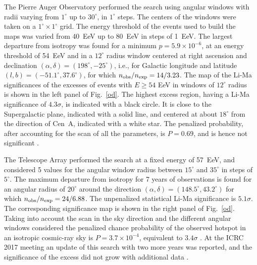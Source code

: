 \documentclass[twoside,12pt]{article}
\begin{document}
 The Pierre Auger Observatory performed the search using angular windows with radii varying from $1^\circ$ up to $30^\circ$, in $1^\circ$ steps. The centers of the windows were taken on a $1^\circ \times 1^\circ$ grid. The energy threshold of the events used to build the maps was varied from 40~EeV up to 80~EeV in steps of 1~EeV. The largest departure from isotropy was found for a minimum  $p = 5.9 \times 10^{-6}$, at an energy threshold of 54~EeV and in a $12^\circ$ radius window centered at right ascension and declination  $(\alpha,\delta)=(198^\circ ,-25^\circ  )$, i.e., for Galactic longitude and latitude $( l , b ) = ( - 51.1^\circ, 37.6^\circ)$, for which $n_{\rm obs}/n_{\rm exp} = 14/3.23$. The map of the Li-Ma \cite{lima83} significances of the excesses of events with $E \geq 54$ EeV in windows of $12^\circ$ radius is shown in the left panel of Fig.~\ref{od}. The highest excess region, having a Li-Ma significance of $4.3\sigma$, is indicated with a black circle. It is close to the Supergalactic plane, indicated with a solid line, and centered at about $18^\circ$ from the direction of Cen~A, indicated with a white star. The penalized probability, after accounting for the scan of all the parameters, is $P=0.69$, and is hence not significant \cite{SS15}.
 
 The Telescope Array performed the search at a fixed energy of 57~EeV, and considered 5 values for the angular window radius between $15^\circ$ and $35^\circ$ in steps of $5^\circ$. The maximum departure from isotropy for 7 years of observations is found for an angular radius of $20^\circ$ around the direction $(\alpha,\delta)= (148.5^\circ, 43.2^\circ)$ for which $n_{\rm obs}/n_{\rm exp} = 24/6.88$. The unpenalized statistical Li-Ma significance is $5.1\sigma$. The corresponding significance map is shown in the right panel of Fig.~\ref{od}. Taking into account the scan in the sky direction and the different angular windows considered the penalized chance probability of the observed hotspot in an isotropic cosmic-ray sky is $P = 3.7\times 10^{-4}$, equivalent to $3.4 \sigma$ \cite{taicrc15}. At the ICRC 2017 meeting an update of this search with two more years was reported, and the significance of the excess did not grow with additional data \cite{icrc17ta}.
\end{document}
